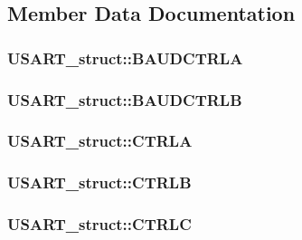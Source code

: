 \subsection{Member Data Documentation}
\hypertarget{struct_u_s_a_r_t__struct_a156478eba14caaede2f2af05df07c220}{
\subsubsection[{BAUDCTRLA}]{ {\bf USART\_\-struct::BAUDCTRLA}}}
\label{struct_u_s_a_r_t__struct_a156478eba14caaede2f2af05df07c220}
\hypertarget{struct_u_s_a_r_t__struct_abed00969aec542e5baf590eb9afbd6fa}{
\subsubsection[{BAUDCTRLB}]{ {\bf USART\_\-struct::BAUDCTRLB}}}
\label{struct_u_s_a_r_t__struct_abed00969aec542e5baf590eb9afbd6fa}
\hypertarget{struct_u_s_a_r_t__struct_ad84de636c48d65671de507feb013e6d9}{
\subsubsection[{CTRLA}]{ {\bf USART\_\-struct::CTRLA}}}
\label{struct_u_s_a_r_t__struct_ad84de636c48d65671de507feb013e6d9}
\hypertarget{struct_u_s_a_r_t__struct_aa3385a22a6299a55d51155f94943e2d0}{
\subsubsection[{CTRLB}]{ {\bf USART\_\-struct::CTRLB}}}
\label{struct_u_s_a_r_t__struct_aa3385a22a6299a55d51155f94943e2d0}
\hypertarget{struct_u_s_a_r_t__struct_aee1ddff9650e8f97f0c76c525a7ed20b}{
\subsubsection[{CTRLC}]{ {\bf USART\_\-struct::CTRLC}}}
